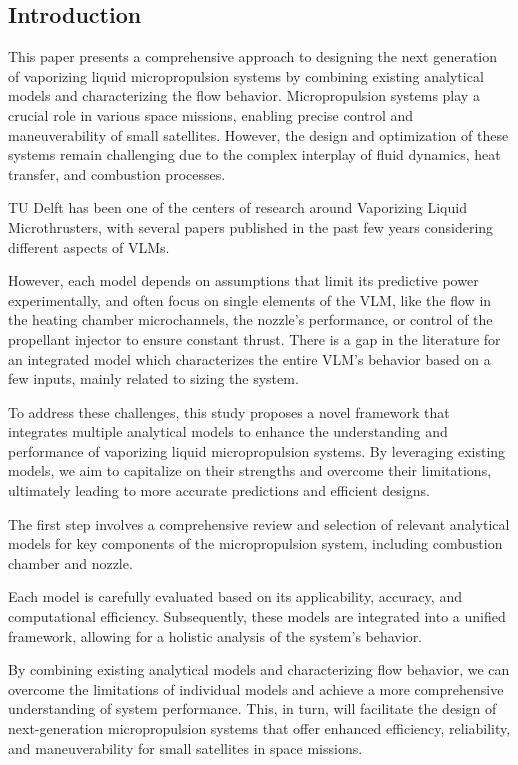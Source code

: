 \documentclass{homework}
\begin{document}
\begin{multicols}{2} %
\section{Introduction}

This paper presents a comprehensive approach to designing the next generation of vaporizing liquid micropropulsion systems by combining existing analytical models and characterizing the flow behavior. Micropropulsion systems play a crucial role in various space missions, enabling precise control and maneuverability of small satellites. However, the design and optimization of these systems remain challenging due to the complex interplay of fluid dynamics, heat transfer, and combustion processes.

TU Delft has been one of the centers of research around Vaporizing Liquid Microthrusters, with several papers published in the past few years considering different aspects of VLMs.

However, each model depends on assumptions that limit its predictive power experimentally, and often focus on single elements of the VLM, like the flow in the heating chamber microchannels, the nozzle's performance, or control of the propellant injector to ensure constant thrust. There is a gap in the literature for an integrated model which characterizes the entire VLM's behavior based on a few inputs, mainly related to sizing the system.

To address these challenges, this study proposes a novel framework that integrates multiple analytical models to enhance the understanding and performance of vaporizing liquid micropropulsion systems. By leveraging existing models, we aim to capitalize on their strengths and overcome their limitations, ultimately leading to more accurate predictions and efficient designs.

The first step involves a comprehensive review and selection of relevant analytical models for key components of the micropropulsion system, including combustion chamber and nozzle.

Each model is carefully evaluated based on its applicability, accuracy, and computational efficiency. Subsequently, these models are integrated into a unified framework, allowing for a holistic analysis of the system's behavior.

By combining existing analytical models and characterizing flow behavior, we can overcome the limitations of individual models and achieve a more comprehensive understanding of system performance. This, in turn, will facilitate the design of next-generation micropropulsion systems that offer enhanced efficiency, reliability, and maneuverability for small satellites in space missions.


\end{multicols}
\end{document}
